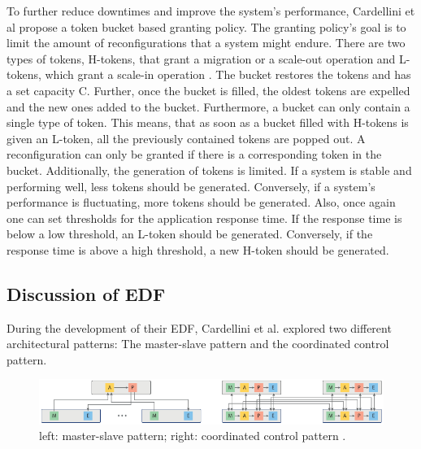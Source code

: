         To further reduce downtimes and improve the system's performance, Cardellini et al propose a token bucket based granting policy.
        The granting policy's goal is to limit the amount of reconfigurations that a system might endure.
        There are two types of tokens, H-tokens, that grant a migration or a scale-out operation and L-tokens, which grant a scale-in operation \cite{cardellini}.
        The bucket restores the tokens and has a set capacity C. Further, once the bucket is filled, the oldest tokens are expelled and the new ones added to the bucket.
        Furthermore, a bucket can only contain a single type of token. This means, that as soon as a bucket filled with H-tokens is given an L-token, all the previously contained tokens 
        are popped out.
        A reconfiguration can only be granted if there is a corresponding token in the bucket.
        Additionally, the generation of tokens is limited. If a system is stable and performing well, less tokens should be generated. Conversely, if a system's performance 
        is fluctuating, more tokens should be generated.
        Also, once again one can set thresholds for the application response time. If the response time is below a low threshold, an L-token should be generated. 
        Conversely, if the response time is above a high threshold, a new H-token should be generated.


        \subsection{Discussion of EDF}
        \label{sub:discussion-edf}
        During the development of their EDF, Cardellini et al. explored two different architectural patterns: The master-slave pattern and the coordinated control pattern.

        \begin{figure}[hbt]
            \centering
            \includegraphics[width=1.0\textwidth]{Bilder/master_coordinated.png}
            \caption{
                    left: master-slave pattern; right: coordinated control pattern \cite{cardellini}.
            }
            \label{fig:master_coordinated}
        \end{figure}

